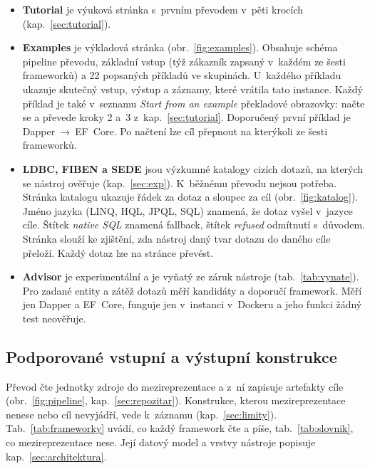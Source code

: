 \begin{itemize}[leftmargin=*,itemsep=1pt]
\item \textbf{Tutorial} je výuková stránka s~prvním převodem v~pěti krocích (kap.~\ref{sec:tutorial}).
\item \textbf{Examples} je výkladová stránka (obr.~\ref{fig:examples}). Obsahuje schéma pipeline převodu, základní vstup (týž zákazník zapsaný v~každém ze šesti frameworků) a 22 popsaných příkladů ve skupinách. U~každého příkladu ukazuje skutečný vstup, výstup a záznamy, které vrátila tato instance. Každý příklad je také v~seznamu \emph{Start from an example} překladové obrazovky: načte se a převede kroky 2 a~3 z~kap.~\ref{sec:tutorial}. Doporučený první příklad je Dapper~→~EF~Core. Po načtení lze cíl přepnout na kterýkoli ze šesti frameworků.
\item \textbf{LDBC, FIBEN a SEDE} jsou výzkumné katalogy cizích dotazů, na kterých se nástroj ověřuje (kap.~\ref{sec:exp}). K~běžnému převodu nejsou potřeba. Stránka katalogu ukazuje řádek za dotaz a sloupec za cíl (obr.~\ref{fig:katalog}). Jméno jazyka (LINQ, HQL, JPQL, SQL) znamená, že dotaz vyšel v~jazyce cíle. Štítek \emph{native SQL} znamená fallback, štítek \emph{refused} odmítnutí s~důvodem. Stránka slouží ke zjištění, zda nástroj daný tvar dotazu do daného cíle přeloží. Každý dotaz lze na stránce převést.
\item \textbf{Advisor} je experimentální a je vyňatý ze záruk nástroje (tab.~\ref{tab:vynate}). Pro zadané entity a zátěž dotazů měří kandidáty a doporučí framework. Měří jen Dapper a EF~Core, funguje jen v~instanci v~Dockeru a jeho funkci žádný test neověřuje.
\end{itemize}



\FloatBarrier
\subsection{Podporované vstupní a výstupní konstrukce}\label{sec:co-jak}

Převod čte jednotky zdroje do mezireprezentace a z~ní zapisuje artefakty cíle (obr.~\ref{fig:pipeline}, kap.~\ref{sec:repozitar}). Konstrukce, kterou mezireprezentace nenese nebo cíl nevyjádří, vede k~záznamu (kap.~\ref{sec:limity}). Tab.~\ref{tab:frameworky} uvádí, co každý framework čte a píše, tab.~\ref{tab:slovnik}, co mezireprezentace nese. Její datový model a vrstvy nástroje popisuje kap.~\ref{sec:architektura}.

